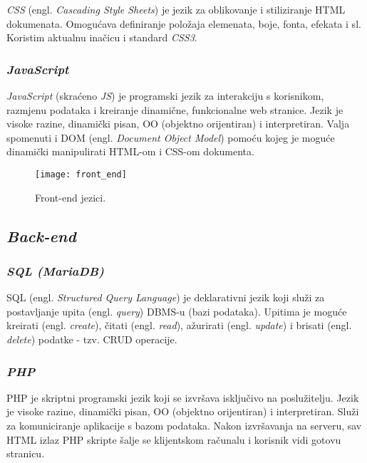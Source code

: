      \textit{CSS} (engl. \textit{Cascading Style Sheets}) je jezik za
      oblikovanje i stiliziranje HTML dokumenata. Omogućava definiranje položaja
      elemenata, boje, fonta, efekata i sl. Koristim aktualnu inačicu i standard
      \textit{CSS3}.

    \subsubsection*{\textit{JavaScript}}

      \textit{JavaScript} (skraćeno \textit{JS}) je programski jezik za
      interakciju s korisnikom, razmjenu podataka i kreiranje dinamične,
      funkcionalne web stranice. Jezik je visoke razine, dinamički pisan, OO
      (objektno orijentiran) i interpretiran. Valja spomenuti i DOM (engl.
      \textit{Document Object Model}) pomoću kojeg je moguće dinamički
      manipulirati HTML-om i CSS-om dokumenta.

    \begin{figure}[h]
      \centering
      \texttt{[image: front\_end]}
      \vspace{0.5cm}
      \caption{Front-end jezici.}
    \end{figure}

  \subsection{\textit{Back-end}}

    \subsubsection*{\textit{SQL (MariaDB)}}

      SQL (engl. \textit{Structured Query Language}) je deklarativni jezik koji
      služi za postavljanje upita (engl. \textit{query}) DBMS-u (bazi podataka).
      Upitima je moguće kreirati (engl. \textit{create}), čitati (engl.
      \textit{read}), ažurirati (engl. \textit{update}) i brisati (engl.
      \textit{delete}) podatke - tzv. CRUD operacije.

    \subsubsection*{\textit{PHP}}

      PHP je skriptni programski jezik koji se izvršava isključivo na
      poslužitelju. Jezik je visoke razine, dinamički pisan, OO (objektno
      orijentiran) i interpretiran. Služi za komuniciranje aplikacije s bazom
      podataka. Nakon izvršavanja na serveru, sav HTML izlaz PHP skripte šalje
      se klijentskom računalu i korisnik vidi gotovu stranicu.

